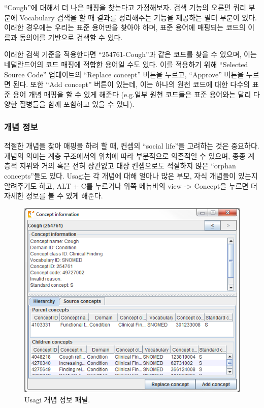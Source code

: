 \documentclass[11pt]{book}
\theoremstyle{definition}
\theoremstyle{definition}
\theoremstyle{definition}
\theoremstyle{remark}
\begin{document}
``Cough''에 대해서 더 나은 매핑을 찾는다고 가정해보자. 검색 기능의
오른편 쿼리 부분에 Vocabulary 검색을 할 때 결과를 정리해주는 기능을
제공하는 필터 부분이 있다. 이러한 경우에는 우리는 표준 용어만을 찾아야
하며, 표준 용어에 매핑되는 코드의 이름과 동의어를 기반으로 검색할 수
있다.

이러한 검색 기준을 적용한다면 ``254761-Cough''과 같은 코드를 찾을 수
있으며, 이는 네덜란드어의 코드 매핑에 적합한 용어일 수도 있다. 이를
적용하기 위해 ``Selected Source Code'' 업데이트의 ``Replace concept''
버튼을 누르고, ``Approve'' 버튼을 누르면 된다. 또한 ``Add concept''
버튼이 있는데, 이는 하나의 원천 코드에 대한 다수의 표준 용어 개념 매핑을
할 수 있게 해준다 (e.g.일부 원천 코드들은 표준 용어와는 달리 다양한
질병들을 함께 포함하고 있을 수 있다).

\subsubsection*{개념 정보}\label{-}

적절한 개념을 찾아 매핑을 하려 할 때, 컨셉의 ``social life''을 고려하는
것은 중요하다. 개념의 의미는 계층 구조에서의 위치에 따라 부분적으로
의존적일 수 있으며, 종종 계층적 지위와 거의 혹은 전혀 상관없고 대상
컨셉으로도 적절하지 않은 ``orphan concepts''들도 있다. Usagi는 각 개념에
대해 얼마나 많은 부모, 자식 개념들이 있는지 알려주기도 하고, ALT + C를
누르거나 위쪽 메뉴바의 view -\textgreater{} Concept을 누르면 더 자세한
정보를 볼 수 있게 해준다.

\begin{figure}

{\centering \includegraphics[width=1\linewidth]{images/ExtractTransformLoad/usagiConceptInfo} 

}

\caption{Usagi 개념 정보 패널.}\label{fig:usagiConceptInfo}
\end{figure}
\end{document}
